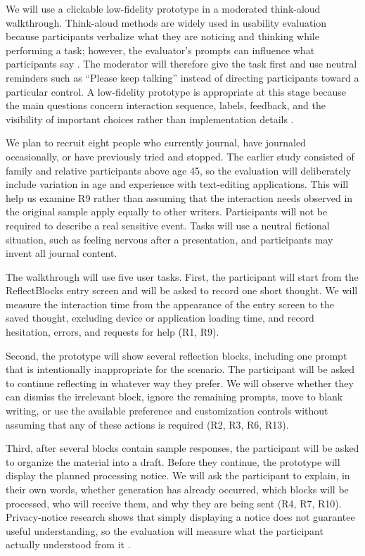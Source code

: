 \documentclass[sigconf,nonacm]{acmart}
\begin{document}
We will use a clickable low-fidelity prototype in a moderated think-aloud
walkthrough. Think-aloud methods are widely used in usability evaluation because
participants verbalize what they are noticing and thinking while performing a
task; however, the evaluator's prompts can influence what participants say
\cite{mcdonald2012thinkaloud}. The moderator will therefore give the task first
and use neutral reminders such as ``Please keep talking'' instead of directing
participants toward a particular control. A low-fidelity prototype is appropriate
at this stage because the main questions concern interaction sequence, labels,
feedback, and the visibility of important choices rather than implementation
details \cite{rettig1994prototyping}.

We plan to recruit eight people who currently journal, have journaled
occasionally, or have previously tried and stopped. The earlier study consisted
of family and relative participants above age 45, so the evaluation will
deliberately include variation in age and experience with text-editing
applications. This will help us examine R9 rather than assuming that the
interaction needs observed in the original sample apply equally to other
writers. Participants will not be required to describe a real sensitive event.
Tasks will use a neutral fictional situation, such as feeling nervous after a
presentation, and participants may invent all journal content.

The walkthrough will use five user tasks. First, the participant will start from
the ReflectBlocks entry screen and will be asked to record one short thought.
We will measure the interaction time from the appearance of the entry screen to
the saved thought, excluding device or application loading time, and record
hesitation, errors, and requests for help (R1, R9).

Second, the prototype will show several reflection blocks, including one prompt
that is intentionally inappropriate for the scenario. The participant will be
asked to continue reflecting in whatever way they prefer. We will observe
whether they can dismiss the irrelevant block, ignore the remaining prompts,
move to blank writing, or use the available preference and customization
controls without assuming that any of these actions is required (R2, R3, R6,
R13).

Third, after several blocks contain sample responses, the participant will be
asked to organize the material into a draft. Before they continue, the prototype
will display the planned processing notice. We will ask the participant to
explain, in their own words, whether generation has already occurred, which
blocks will be processed, who will receive them, and why they are being sent
(R4, R7, R10). Privacy-notice research shows that simply displaying a notice
does not guarantee useful understanding, so the evaluation will measure what the
participant actually understood from it \cite{schaub2015privacy}.
\end{document}
